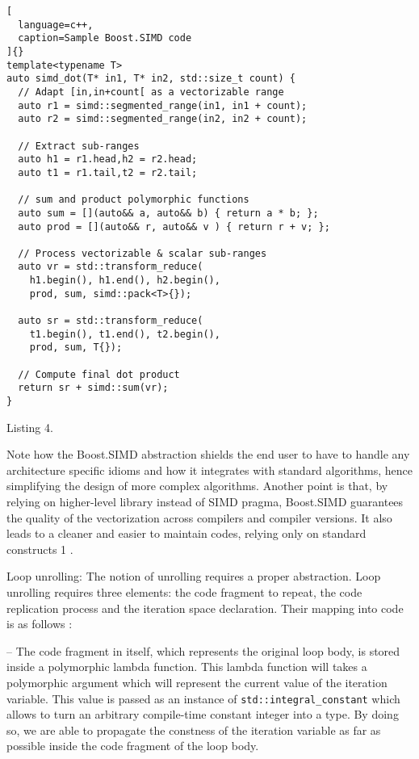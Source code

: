 \documentclass[../../main.tex]{subfiles}
\begin{document}
\begin{lstlisting}[
  language=c++,
  caption=Sample Boost.SIMD code
]{}
template<typename T>
auto simd_dot(T* in1, T* in2, std::size_t count) {
  // Adapt [in,in+count[ as a vectorizable range
  auto r1 = simd::segmented_range(in1, in1 + count);
  auto r2 = simd::segmented_range(in2, in2 + count);

  // Extract sub-ranges
  auto h1 = r1.head,h2 = r2.head;
  auto t1 = r1.tail,t2 = r2.tail;

  // sum and product polymorphic functions
  auto sum = [](auto&& a, auto&& b) { return a * b; };
  auto prod = [](auto&& r, auto&& v ) { return r + v; };

  // Process vectorizable & scalar sub-ranges
  auto vr = std::transform_reduce(
    h1.begin(), h1.end(), h2.begin(),
    prod, sum, simd::pack<T>{});

  auto sr = std::transform_reduce(
    t1.begin(), t1.end(), t2.begin(),
    prod, sum, T{});

  // Compute final dot product
  return sr + simd::sum(vr);
}
\end{lstlisting}
Listing 4.

Note how the Boost.SIMD abstraction shields the end
user to have to handle any architecture specific idioms
and how it integrates with standard algorithms, hence
simplifying the design of more complex algorithms.
Another point is that, by relying on higher-level library
instead of SIMD pragma, Boost.SIMD guarantees
the quality of the vectorization across compilers and
compiler versions. It also leads to a cleaner and easier to
maintain codes, relying only on standard \cpp constructs 1 .

\item Loop unrolling: The notion of unrolling requires
a proper abstraction. Loop unrolling requires three
elements: the code fragment to repeat, the code
replication process and the iteration space declaration.
Their mapping into \cpp code is as follows :

– The code fragment in itself, which represents
the original loop body, is stored inside a
polymorphic lambda function. This lambda
function will takes a polymorphic argument which
will represent the current value of the iteration
variable. This value is passed as an instance of
\lstinline{std::integral_constant} which allows to
turn an arbitrary compile-time constant integer into
a type. By doing so, we are able to propagate the
constness of the iteration variable as far as possible
inside the code fragment of the loop body.
\end{document}
